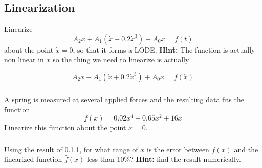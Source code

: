 \documentclass{article}	%
\begin{document}
\subsection{Linearization}

 Linearize
\[
A_2 \ddot{x} + A_1(\dot{x}+0.2\dot{x}^3) + A_0x  = f(t)
\]
about the point $\dot{x} = 0$, so that it forms a LODE.
{\bf Hint: }  The function is actually non linear in $\dot{x}$ so the thing we need to linearize is actually

\[
A_2 \ddot{x} + A_1(\dot{x}+0.2\dot{x}^3) + A_0x  = f(\dot{x})
\]

%
%
%
%
\subsubsection{} \label{LinearizePtwo} A spring is measured at several applied forces and the resulting data fits the function
\[
f(x) =0.02x^4  +  0.65x^2+ 16x
\]
Linearize this function about the point $x=0$.

%
%
%
%
%
%
\subsubsection{}
Using the result of \ref{LinearizePtwo}, for what range of $x$ is the error between $f(x)$ and the linearized function $\hat{f}(x)$ less than 10\%?
{\bf Hint:} find the result numerically.
\end{document}
